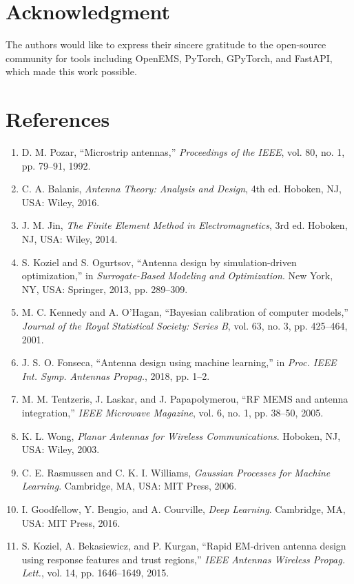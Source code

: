 \documentclass[conference]{IEEEtran}
\begin{document}
\section*{Acknowledgment}
The authors would like to express their sincere gratitude to the open-source community for tools including OpenEMS, PyTorch, GPyTorch, and FastAPI, which made this work possible.

\section*{References}
\begin{enumerate}
    \item D. M. Pozar, ``Microstrip antennas,'' \emph{Proceedings of the IEEE}, vol. 80, no. 1, pp. 79--91, 1992.
    \item C. A. Balanis, \emph{Antenna Theory: Analysis and Design}, 4th ed. Hoboken, NJ, USA: Wiley, 2016.
    \item J. M. Jin, \emph{The Finite Element Method in Electromagnetics}, 3rd ed. Hoboken, NJ, USA: Wiley, 2014.
    \item S. Koziel and S. Ogurtsov, ``Antenna design by simulation-driven optimization,'' in \emph{Surrogate-Based Modeling and Optimization}. New York, NY, USA: Springer, 2013, pp. 289--309.
    \item M. C. Kennedy and A. O'Hagan, ``Bayesian calibration of computer models,'' \emph{Journal of the Royal Statistical Society: Series B}, vol. 63, no. 3, pp. 425--464, 2001.
    \item J. S. O. Fonseca, ``Antenna design using machine learning,'' in \emph{Proc. IEEE Int. Symp. Antennas Propag.}, 2018, pp. 1--2.
    \item M. M. Tentzeris, J. Laskar, and J. Papapolymerou, ``RF MEMS and antenna integration,'' \emph{IEEE Microwave Magazine}, vol. 6, no. 1, pp. 38--50, 2005.
    \item K. L. Wong, \emph{Planar Antennas for Wireless Communications}. Hoboken, NJ, USA: Wiley, 2003.
    \item C. E. Rasmussen and C. K. I. Williams, \emph{Gaussian Processes for Machine Learning}. Cambridge, MA, USA: MIT Press, 2006.
    \item I. Goodfellow, Y. Bengio, and A. Courville, \emph{Deep Learning}. Cambridge, MA, USA: MIT Press, 2016.
    \item S. Koziel, A. Bekasiewicz, and P. Kurgan, ``Rapid EM-driven antenna design using response features and trust regions,'' \emph{IEEE Antennas Wireless Propag. Lett.}, vol. 14, pp. 1646--1649, 2015.

\end{enumerate}
\end{document}
